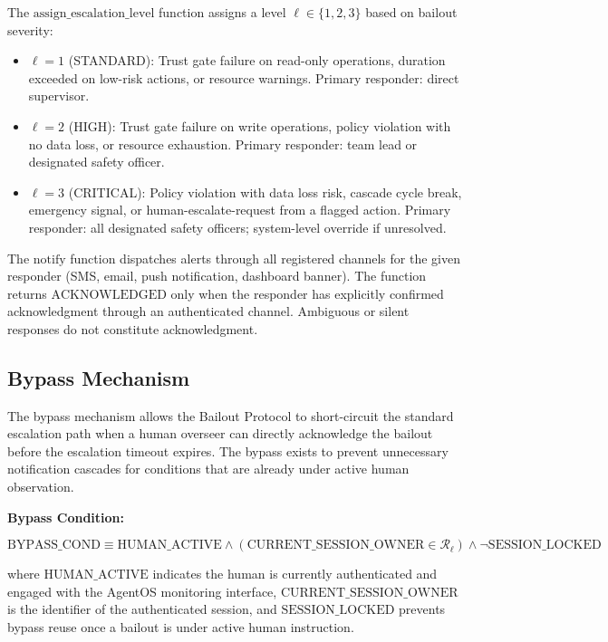 The $\text{assign\_escalation\_level}$ function assigns a level $\ell \in \{1, 2, 3\}$ based on bailout severity:

\begin{itemize}
  \item $\ell = 1$ (STANDARD): Trust gate failure on read-only operations, duration exceeded on low-risk actions, or resource warnings. Primary responder: direct supervisor.
  \item $\ell = 2$ (HIGH): Trust gate failure on write operations, policy violation with no data loss, or resource exhaustion. Primary responder: team lead or designated safety officer.
  \item $\ell = 3$ (CRITICAL): Policy violation with data loss risk, cascade cycle break, emergency signal, or human-escalate-request from a flagged action. Primary responder: all designated safety officers; system-level override if unresolved.
\end{itemize}

The $\text{notify}$ function dispatches alerts through all registered channels for the given responder (SMS, email, push notification, dashboard banner). The function returns $\text{ACKNOWLEDGED}$ only when the responder has explicitly confirmed acknowledgment through an authenticated channel. Ambiguous or silent responses do not constitute acknowledgment.

\subsection{Bypass Mechanism}
\label{sec:bypass}

The bypass mechanism allows the Bailout Protocol to short-circuit the standard escalation path when a human overseer can directly acknowledge the bailout before the escalation timeout expires. The bypass exists to prevent unnecessary notification cascades for conditions that are already under active human observation.

\medskip\noindent\textbf{Bypass Condition:}

\begin{equation}
\text{BYPASS\_COND} \equiv \text{HUMAN\_ACTIVE} \land (\text{CURRENT\_SESSION\_OWNER} \in \mathcal{R}_{\ell}) \land \neg \text{SESSION\_LOCKED}
\end{equation}

where $\text{HUMAN\_ACTIVE}$ indicates the human is currently authenticated and engaged with the AgentOS monitoring interface, $\text{CURRENT\_SESSION\_OWNER}$ is the identifier of the authenticated session, and $\text{SESSION\_LOCKED}$ prevents bypass reuse once a bailout is under active human instruction.

